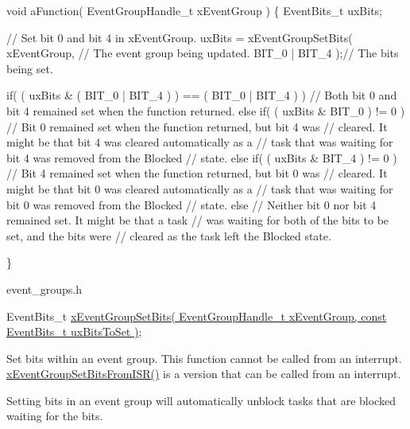 \begin{DoxyPre}  void aFunction( EventGroupHandle\_t xEventGroup )
  \{
  EventBits\_t uxBits;
\begin{DoxyVerb} // Set bit 0 and bit 4 in xEventGroup.
 uxBits = xEventGroupSetBits(
                     xEventGroup,    // The event group being updated.
                     BIT_0 | BIT_4 );// The bits being set.

 if( ( uxBits & ( BIT_0 | BIT_4 ) ) == ( BIT_0 | BIT_4 ) )
 {
     // Both bit 0 and bit 4 remained set when the function returned.
 }
 else if( ( uxBits & BIT_0 ) != 0 )
 {
     // Bit 0 remained set when the function returned, but bit 4 was
     // cleared.  It might be that bit 4 was cleared automatically as a
     // task that was waiting for bit 4 was removed from the Blocked
     // state.
 }
 else if( ( uxBits & BIT_4 ) != 0 )
 {
     // Bit 4 remained set when the function returned, but bit 0 was
     // cleared.  It might be that bit 0 was cleared automatically as a
     // task that was waiting for bit 0 was removed from the Blocked
     // state.
 }
 else
 {
     // Neither bit 0 nor bit 4 remained set.  It might be that a task
     // was waiting for both of the bits to be set, and the bits were
     // cleared as the task left the Blocked state.
 }
\end{DoxyVerb}

  \}
  \end{DoxyPre}


event\+\_\+groups.\+h 
\begin{DoxyPre}
   EventBits\_t \hyperlink{externals_2freertos_2include_2event__groups_8h_a02d7b3bb55f7e11d9c47116266c5fb2e}{xEventGroupSetBits( EventGroupHandle\_t xEventGroup, const EventBits\_t uxBitsToSet )};
\end{DoxyPre}


Set bits within an event group. This function cannot be called from an interrupt. \hyperlink{vendor_2ceedling_2plugins_2freertos_2src_2freertos_2include_2event__groups_8h_a62b68278abac6358369ae8e390988a02}{x\+Event\+Group\+Set\+Bits\+From\+I\+S\+R()} is a version that can be called from an interrupt.

Setting bits in an event group will automatically unblock tasks that are blocked waiting for the bits.


